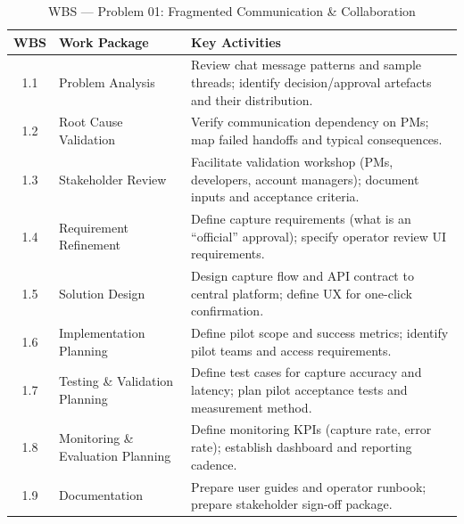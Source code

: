 \documentclass[12pt,a4paper]{report}
\begin{document}
\begin{table}[H]
\centering
\renewcommand{\arraystretch}{1.25}
\small
\begin{tabularx}{\textwidth}{|c|p{4.2cm}|X|}
\hline
\rowcolor{secondary}
\textbf{WBS} & \textbf{Work Package} & \textbf{Key Activities} \\
\hline
1.1 & Problem Analysis & Review chat message patterns and sample threads; identify decision/approval artefacts and their distribution. \\
\hline
1.2 & Root Cause Validation & Verify communication dependency on PMs; map failed handoffs and typical consequences. \\
\hline
1.3 & Stakeholder Review & Facilitate validation workshop (PMs, developers, account managers); document inputs and acceptance criteria. \\
\hline
1.4 & Requirement Refinement & Define capture requirements (what is an ``official'' approval); specify operator review UI requirements. \\
\hline
1.5 & Solution Design & Design capture flow and API contract to central platform; define UX for one-click confirmation. \\
\hline
1.6 & Implementation Planning & Define pilot scope and success metrics; identify pilot teams and access requirements. \\
\hline
1.7 & Testing \& Validation Planning & Define test cases for capture accuracy and latency; plan pilot acceptance tests and measurement method. \\
\hline
1.8 & Monitoring \& Evaluation Planning & Define monitoring KPIs (capture rate, error rate); establish dashboard and reporting cadence. \\
\hline
1.9 & Documentation & Prepare user guides and operator runbook; prepare stakeholder sign-off package. \\
\hline
\end{tabularx}
\caption{WBS --- Problem 01: Fragmented Communication \& Collaboration}
\end{table}
\end{document}
